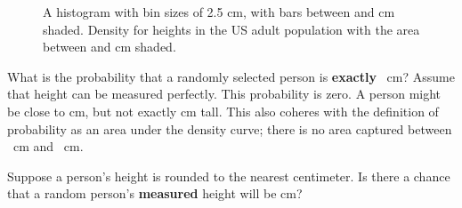 \begin{figure}[h]
	\centering
	\caption{ A histogram with bin sizes of 2.5 cm, with bars between  and  cm shaded.   Density for heights in the US adult population with the area between  and  cm shaded.}
\end{figure}

\begin{examplewrap}
\begin{nexample}{What is the probability that a randomly selected person is \textbf{exactly} ~cm? Assume that height can be measured perfectly.}
	\label{probabilityOfExactly180cm}
	This probability is zero. A person might be close to  cm, but not exactly  cm tall. This also coheres with the definition of probability as an area under the density curve; there is no area captured between ~cm and ~cm.
\end{nexample}
\end{examplewrap}

\begin{exercisewrap}
\begin{nexercise}
Suppose a person's height is rounded to the nearest centimeter. Is there a chance that a random person's \textbf{measured} height will be  cm?\footnotemark{}
\end{nexercise}
\end{exercisewrap}

